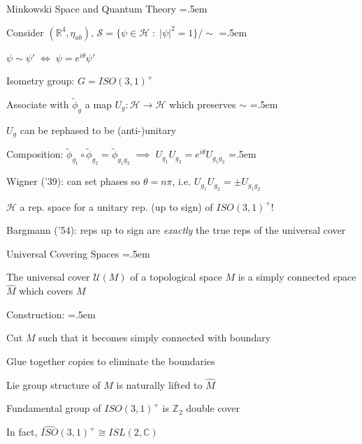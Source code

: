 \documentclass[xcolor={dvipsnames}]{beamer}
\newcommand{\magsq}[1]{\big|#1\big|^2}
\let\olditemize=\itemize
\let\endolditemize=\enditemize
\renewenvironment{itemize}{\olditemize \itemsep=.5em }{\endolditemize}
\begin{document}
\begin{frame}{Minkowski Space and Quantum Theory}
    \begin{itemize}
        \item<2-> Consider $(\mathbb{R}^4, \eta_{ab})$, $\mathcal{S} = \{\psi \in \mathcal{H}\;:\; \magsq{\psi} = 1\}/\sim$
        \begin{itemize}
            \item<3-> $\psi \sim \psi' \;\iff\; \psi = e^{i\theta}\psi' $
        \end{itemize}  
        \item<4-> Isometry group: $G = ISO(3, 1)^+$
        \item<5-> Associate with $\tilde{\phi}_g$ a map $U_g: \mathcal{H}\rightarrow\mathcal{H}$ which preserves $\sim$
        \begin{itemize}
            \item<6-> $U_g$ can be rephased to be (anti-)unitary
        \end{itemize}
        \item<7-> Composition: $\tilde{\phi}_{g_1}\circ\tilde{\phi}_{g_2} = \tilde{\phi}_{g_1g_2} \;\implies\; U_{g_1}U_{g_2} = e^{i\theta}U_{g_1g_2}$
        \begin{itemize}
            \item<8-> Wigner ('39): can set phases so $\theta = n\pi$, i.e. $U_{g_1}U_{g_2} = \pm U_{g_1g_2}$
        \end{itemize}
        \item<9-> $\mathcal{H}$ a rep. space for a unitary rep. (up to sign) of $ISO(3, 1)^+$!
        \item<10-> Bargmann ('54): reps up to sign are \textit{exactly} the true reps of the universal cover
    \end{itemize}
\end{frame}

\begin{frame}{Universal Covering Spaces}
    \begin{itemize}
        \item<2-> The universal cover $\mathcal{U}(M)$ of a topological space $M$ is a simply connected space $\hat{M}$ which covers $M$
        \item<3-> Construction:
        \begin{itemize}
            \item<4-> Cut $M$ such that it becomes simply connected with boundary
            \item<5-> Glue together copies to eliminate the boundaries
        \end{itemize}
        \item<4-> Lie group structure of $M$ is naturally lifted to $\hat{M}$
        \item<5-> Fundamental group of $ISO(3, 1)^+$ is $\mathbb{Z}_2$ \textrightarrow\; double cover
        \item<6-> In fact, $\widehat{ISO}(3, 1)^+ \cong ISL(2, \mathbb{C})$
    \end{itemize}
\end{frame}
\end{document}
